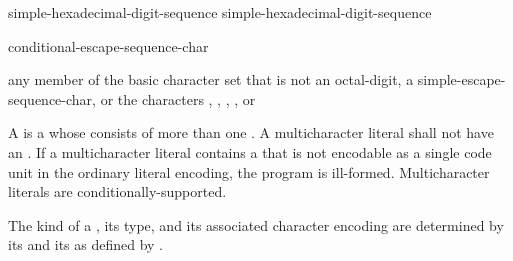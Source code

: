 \begin{bnf}
\br
     simple-hexadecimal-digit-sequence\br
     simple-hexadecimal-digit-sequence \literalterminal{\}}
\end{bnf}

\begin{bnf}
\br
    \terminal{\textbackslash} conditional-escape-sequence-char
\end{bnf}

\begin{bnf}
\br
    \textnormal{any member of the basic character set that is not an} octal-digit\textnormal{, a} simple-escape-sequence-char\textnormal{, or the characters , , , , or }
\end{bnf}

\pnum
{}%
%
%
%
%
%
%
%
%
%
A  is a 
whose  consists of
more than one .
A multicharacter literal shall not have an .
If a multicharacter literal contains a 
that is not encodable as a single code unit in the ordinary literal encoding,
the program is ill-formed.
Multicharacter literals are conditionally-supported.

\pnum
The kind of a ,
its type, and its associated character encoding
are determined by
its  and its 
as defined by .

